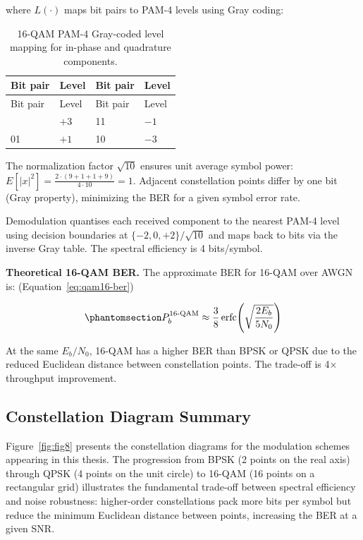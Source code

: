 where \(L(\cdot)\) maps bit pairs to PAM-4 levels using Gray coding:

\begin{longtable}[]{@{}llll@{}}
\caption{16-QAM PAM-4 Gray-coded level mapping for in-phase and quadrature components.}\label{tbl:table30}\tabularnewline
\toprule\noalign{}
Bit pair & Level & Bit pair & Level \\
\midrule\noalign{}
\endfirsthead
\toprule\noalign{}
Bit pair & Level & Bit pair & Level \\
\midrule\noalign{}
\endhead
\bottomrule\noalign{}
\endlastfoot
00 & \(+3\) & 11 & \(-1\) \\
01 & \(+1\) & 10 & \(-3\) \\
\end{longtable}

The normalization factor \(\sqrt{10}\) ensures unit average symbol power: \(E[|x|^2] = \frac{2 \cdot (9+1+1+9)}{4 \cdot 10} = 1\). Adjacent constellation points differ by one bit (Gray property), minimizing the BER for a given symbol error rate.

Demodulation quantises each received component to the nearest PAM-4 level using decision boundaries at \(\{-2, 0, +2\}/\sqrt{10}\) and maps back to bits via the inverse Gray table. The spectral efficiency is 4 bits/symbol.

\textbf{Theoretical 16-QAM BER.} The approximate BER for 16-QAM over AWGN is: (Equation~\ref{eq:qam16-ber})

\begin{equation}\protect\phantomsection\label{eq:qam16-ber}{P_b^{\text{16-QAM}} \approx \frac{3}{8} \operatorname{erfc}\!\left(\sqrt{\frac{2E_b}{5N_0}}\right)
}\end{equation}

At the same \(E_b/N_0\), 16-QAM has a higher BER than BPSK or QPSK due to the reduced Euclidean distance between constellation points. The trade-off is 4× throughput improvement.

\subsection{Constellation Diagram Summary}\label{sec:constellation-diagram-summary}

Figure~\ref{fig:fig8} presents the constellation diagrams for the modulation schemes appearing in this thesis. The progression from BPSK (2 points on the real axis) through QPSK (4 points on the unit circle) to 16-QAM (16 points on a rectangular grid) illustrates the fundamental trade-off between spectral efficiency and noise robustness: higher-order constellations pack more bits per symbol but reduce the minimum Euclidean distance between points, increasing the BER at a given SNR.


